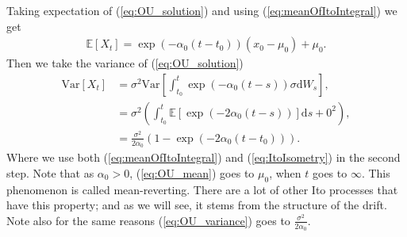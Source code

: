 Taking expectation of (\ref{eq:OU_solution}) and using (\ref{eq:meanOfItoIntegral}) we get
\begin{align}
    \mathbb{E}\left[X_t\right] = \exp\left(-\alpha_0\left(t - t_0\right)\right)\left(x_0 - \mu_0\right) + \mu_0. \label{eq:OU_mean}
\end{align}
Then we take the variance of (\ref{eq:OU_solution})
\begin{align}
    \mathrm{Var}\left[X_t\right] &= \sigma^2\mathrm{Var}\left[\int_{t_0}^t \exp\left(-\alpha_0 \left(t - s\right)\right)\sigma \mathrm{d}W_s\right],\nonumber \\
    & = \sigma^2\left(\int_{t_0}^t \mathbb{E}\left[\exp\left(-2\alpha_0\left(t - s\right)\right)\right] \mathrm{d}s + 0^2 \right), \nonumber \\
    & = \frac{\sigma^2}{2\alpha_0}\left(1 - \exp\left(-2\alpha_0(t - t_0)\right)\right). \label{eq:OU_variance}
\end{align}
Where we use both (\ref{eq:meanOfItoIntegral}) and (\ref{eq:ItoIsometry}) in the second step. Note that as $\alpha_0 > 0$, (\ref{eq:OU_mean}) goes to $\mu_0$, when $t$ goes to $\infty$. This phenomenon is called mean-reverting. There are a lot of other Ito processes that have this property; and as we will see, it stems from the structure of the drift. Note also for the same reasons (\ref{eq:OU_variance}) goes to $\frac{\sigma^2}{2\alpha_0}$.
